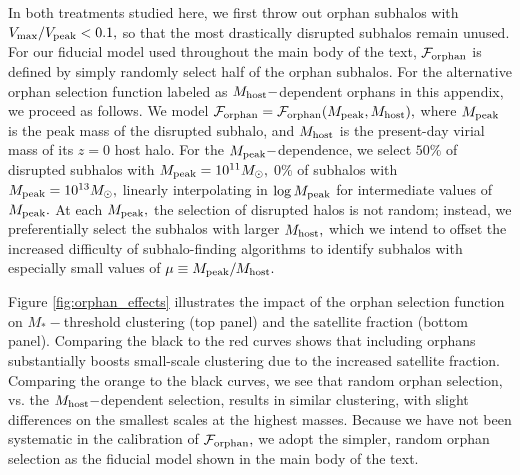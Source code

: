 \documentclass[usenatbib,usegraphicx,letterpaper]{mn2e}
\newcommand{\mstar}{M_{\ast}}
\newcommand{\mpeak}{M_{\rm peak}}
\newcommand{\mhost}{M_{\rm host}}
\newcommand{\msun}{M_\odot}
\begin{document}
In both treatments studied here, we first throw out orphan subhalos with $V_{\rm max}/V_{\rm peak}<0.1,$ so that the most drastically disrupted subhalos remain unused. For our fiducial model used throughout the main body of the text, $\mathcal{F}_{\rm orphan}$ is defined by simply randomly select half of the orphan subhalos. For the alternative orphan selection function labeled as $M_{\rm host}-$dependent orphans in this appendix, we proceed as follows. We model $\mathcal{F}_{\rm orphan}=\mathcal{F}_{\rm orphan}(M_{\rm peak},M_{\rm host}),$ where $\mpeak$ is the peak mass of the disrupted subhalo, and $\mhost$ is the present-day virial mass of its $z=0$ host halo. For the $\mpeak-$dependence, we select $50\%$ of disrupted subhalos with $\mpeak=10^{11}\msun,$ $0\%$ of subhalos with $\mpeak=10^{13}\msun,$ linearly interpolating in $\log\mpeak$ for intermediate values of $\mpeak.$ At each $\mpeak,$ the selection of disrupted halos is not random; instead, we preferentially select the subhalos with larger $\mhost,$ which we intend to offset the increased difficulty of subhalo-finding algorithms to identify subhalos with especially small values of  $\mu\equiv\mpeak/\mhost.$ 

Figure \ref{fig:orphan_effects} illustrates the impact of the orphan selection function on $\mstar-$threshold clustering (top panel) and the satellite fraction (bottom panel). Comparing the black to the red curves shows that including orphans substantially boosts small-scale clustering due to the increased satellite fraction. Comparing the orange to the black curves, we see that random orphan selection, vs. the $M_{\rm host}-$dependent selection, results in similar clustering, with slight differences on the smallest scales at the highest masses. Because we have not been systematic in the calibration of $\mathcal{F}_{\rm orphan},$ we adopt the simpler, random orphan selection as the fiducial model shown in the main body of the text.
\end{document}
